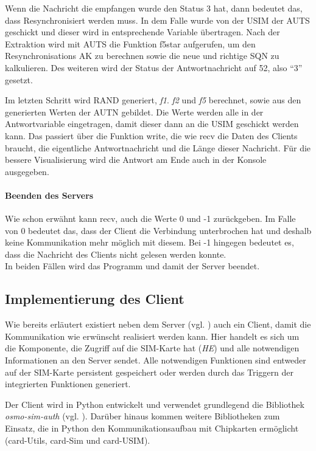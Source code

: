 		Wenn die Nachricht die empfangen wurde den Status 3 hat, dann bedeutet das, dass Resynchronisiert werden
		muss. In dem Falle wurde von der USIM der AUTS geschickt und dieser wird in entsprechende Variable übertragen.
		Nach der Extraktion wird mit AUTS die Funktion f5star aufgerufen, um den Resynchronisations AK zu berechnen
		sowie die neue und richtige SQN zu kalkulieren. Des weiteren wird der Status der Antwortnachricht auf 52, also ``3''
		gesetzt.
		
		Im letzten Schritt wird RAND generiert, \emph{f1}. \emph{f2} und \emph{f5} berechnet, sowie aus den generierten
		Werten der AUTN gebildet. Die Werte werden alle in der Antwortvariable eingetragen, damit dieser dann an die USIM
		geschickt werden kann. Das passiert über die Funktion write, die wie recv die Daten des Clients braucht, die eigentliche
		Antwortnachricht und die Länge dieser Nachricht. Für die bessere Visualisierung wird die Antwort am Ende auch in
		der Konsole ausgegeben.
		
		\paragraph{Beenden des Servers}
		Wie schon erwähnt kann recv, auch die Werte 0 und -1 zurückgeben. Im Falle von 0 bedeutet das, dass der Client
		die Verbindung unterbrochen hat und deshalb keine Kommunikation mehr möglich mit diesem. Bei -1 hingegen bedeutet
		es, dass die Nachricht des Clients nicht gelesen werden konnte. \\
		In beiden Fällen wird das Programm und damit der Server beendet.

    \subsection{Implementierung des Client}
    Wie bereits erläutert existiert neben dem Server (vgl. ) auch ein Client,
    damit die Kommunikation wie erwünscht realisiert werden kann. Hier handelt es sich um die Komponente,
    die Zugriff auf die SIM-Karte hat (\emph{HE}) und alle notwendigen Informationen an den Server sendet.
    Alle notwendigen Funktionen sind entweder auf der SIM-Karte persistent gespeichert oder werden durch
    das Triggern der integrierten Funktionen generiert.

    Der Client wird in Python entwickelt und verwendet grundlegend die Bibliothek \textit{osmo-sim-auth}
    (vgl. ). Darüber hinaus kommen weitere  Bibliotheken zum Einsatz, die in
    Python den Kommunikationsaufbau mit Chipkarten ermöglicht (card-Utils, card-Sim und card-USIM).
